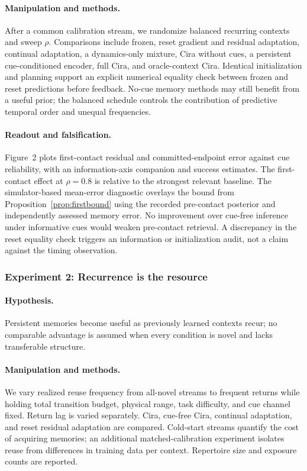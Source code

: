 \paragraph{Manipulation and methods.}
After a common calibration stream, we randomize balanced recurring contexts and sweep $\rho$. Comparisons include frozen, reset gradient and residual adaptation, continual adaptation, a dynamics-only mixture, Cira without cues, a persistent cue-conditioned encoder, full Cira, and oracle-context Cira. Identical initialization and planning support an explicit numerical equality check between frozen and reset predictions before feedback. No-cue memory methods may still benefit from a useful prior; the balanced schedule controls the contribution of predictive temporal order and unequal frequencies.

\paragraph{Readout and falsification.}
Figure~2 plots first-contact residual and committed-endpoint error against cue reliability, with an information-axis companion and success estimates. The first-contact effect at $\rho=0.8$ is \placeholder{} relative to the strongest relevant baseline. The simulator-based mean-error diagnostic overlays the bound from Proposition~\ref{prop:firstbound} using the recorded pre-contact posterior and independently assessed memory error. No improvement over cue-free inference under informative cues would weaken pre-contact retrieval. A discrepancy in the reset equality check triggers an information or initialization audit, not a claim against the timing observation.

\subsubsection{Experiment 2: Recurrence is the resource}
\paragraph{Hypothesis.}
Persistent memories become useful as previously learned contexts recur; no comparable advantage is assumed when every condition is novel and lacks transferable structure.

\paragraph{Manipulation and methods.}
We vary realized reuse frequency from all-novel streams to frequent returns while holding total transition budget, physical range, task difficulty, and cue channel fixed. Return lag is varied separately. Cira, cue-free Cira, continual adaptation, and reset residual adaptation are compared. Cold-start streams quantify the cost of acquiring memories; an additional matched-calibration experiment isolates reuse from differences in training data per context. Repertoire size and exposure counts are reported.

